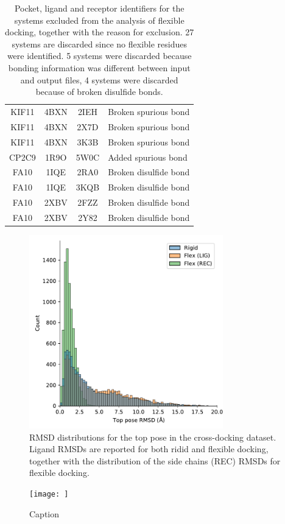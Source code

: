 \documentclass[journal=jcisd8,manuscript=article]{achemso}
\begin{document}
\begin{table}[]
\begin{tabular}{c c c l}
KIF11 & 4BXN & 2IEH & Broken spurious bond \\
KIF11 & 4BXN & 2X7D & Broken spurious bond \\
KIF11 & 4BXN & 3K3B & Broken spurious bond \\
CP2C9 & 1R9O & 5W0C & Added spurious bond \\
FA10 & 1IQE & 2RA0 & Broken disulfide bond \\
FA10 & 1IQE & 3KQB & Broken disulfide bond \\
FA10 & 2XBV	& 2FZZ & Broken disulfide bond \\
FA10 & 2XBV	& 2Y82 & Broken disulfide bond \\
\bottomrule
    \end{tabular}
    \caption{Pocket, ligand and receptor identifiers for the systems excluded from the analysis of flexible docking, together with the reason for exclusion. 27 systems are discarded since no flexible residues were identified. 5 systems were discarded because bonding information was different between input and output files, 4 systems were discarded because of broken disulfide bonds.}
    \label{tab:flexfail}
\end{table}

\begin{figure}    
	\centering
	\includegraphics[width=0.75\textwidth]{figures/crossdocking-flex/rmsd_dists_all.pdf}
	\caption{RMSD distributions for the top pose in the cross-docking dataset. Ligand RMSDs are reported for both ridid and flexible docking, together with the distribution of the side chains (REC) RMSDs for flexible docking.}
	\label{fig:flexRMSDalldist}
\end{figure}  

\begin{figure}
    \centering
    \texttt{[image: ]}
    \caption{Caption}
    \label{fig:my_label}
\end{figure}
\end{document}
